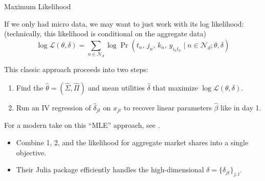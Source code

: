 \documentclass[aspectratio=169,t,11pt,table]{beamer}
\begin{document}
\begin{frame}{Maximum Likelihood}
    \begin{wideitemize}
        \item If we only had micro data, we may want to just work with its log likelihood: \\
        (technically, this likelihood is conditional on the aggregate data)
        \begin{equation*}
            \log\mathcal{L}(\theta, \delta) = \sum_{n \in \mathcal{N}_d} \log \Pr(t_n, \, j_n, \, k_n, \, y_{i_nt_n} \mid n \in \mathcal{N}_d; \theta, \delta)
        \end{equation*}
        \vspace{-1em}
        \pause
        \item This classic approach proceeds into two steps:
        \pause
        \begin{enumerate}
            \item Find the $\hat{\theta} = (\hat{\Sigma}, \hat{\Pi})$ and mean utilities $\hat{\delta}$ that maximize $\log\mathcal{L}(\theta, \delta)$.
            \pause
            \item Run an IV regression of $\hat{\delta}_{jt}$ on $x_{jt}$ to recover linear parameters $\hat{\beta}$ like in day 1.
        \end{enumerate}
        \pause
        \item For a modern take on this ``MLE'' approach, see \cite*{grieco2025optimal}.
        \begin{itemize}
            \item Combine 1, 2, and the likelihood for aggregate market shares into a single objective.
            \item Their Julia package efficiently handles the high-dimensional $\delta = \{\delta_{jt}\}_{j,t}$.
        \end{itemize}
    \end{wideitemize}
\end{frame}
\end{document}
